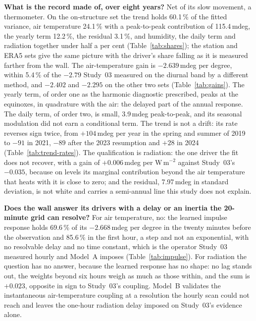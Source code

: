 \documentclass[11pt,a4paper]{article}
\begin{document}
\textbf{What is the record made of, over eight years?} Net of its slow
movement, a thermometer. On the on-structure set the trend holds 60.1\,\% of
the fitted variance, air temperature 24.1\,\% with a peak-to-peak
contribution of 115.4\,mdeg, the yearly term 12.2\,\%, the residual 3.1\,\%,
and humidity, the daily term and radiation together under half a per cent
(Table~\ref{tab:shares}); the station and ERA5 sets give the same picture
with the driver's share falling as it is measured farther from the wall. The
air-temperature gain is $-2.639$\,mdeg per degree, within 5.4\,\% of the
$-2.79$ Study~03 measured on the diurnal band by a different method, and
$-2.402$ and $-2.295$ on the other two sets (Table~\ref{tab:gains}). The
yearly term, of order one as the harmonic diagnostic prescribed, peaks at the
equinoxes, in quadrature with the air: the delayed part of the annual
response. The daily term, of order two, is small, 3.9\,mdeg peak-to-peak, and
its seasonal modulation did not earn a conditional term. The trend is not a
drift: its rate reverses sign twice, from $+104$\,mdeg per year in the spring
and summer of 2019 to $-91$ in 2021, $-89$ after the 2023 resumption and
$+28$ in 2024 (Table~\ref{tab:trend-rates}). The qualification is
radiation: the one driver the fit does not recover, with a gain of
$+0.006$\,mdeg per W\,m$^{-2}$ against Study~03's $-0.035$, because on
levels its marginal contribution beyond the air temperature that heats with
it is close to zero; and the residual, 7.97\,mdeg in standard deviation, is
not white and carries a semi-annual line this study does not explain.

\textbf{Does the wall answer its drivers with a delay or an inertia the
20-minute grid can resolve?} For air temperature, no: the learned impulse
response holds 69.6\,\% of its $-2.668$\,mdeg per degree in the twenty
minutes before the observation and 85.6\,\% in the first hour, a step and not
an exponential, with no resolvable delay and no time constant, which is the
operator Study~03 measured hourly and Model~A imposes
(Table~\ref{tab:impulse}). For radiation the question has no answer, because
the learned response has no shape: no lag stands out, the weights beyond six
hours weigh as much as those within, and the sum is $+0.023$, opposite in
sign to Study~03's coupling. Model~B validates the instantaneous
air-temperature coupling at a resolution the hourly scan could not reach and
leaves the one-hour radiation delay imposed on Study~03's evidence alone.
\end{document}
